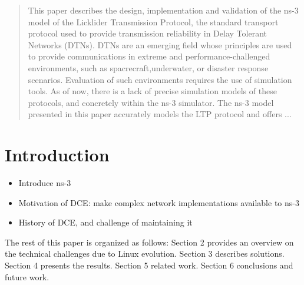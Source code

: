 \documentclass{sig-alternate}
\begin{document}

\maketitle
\begin{abstract}
This paper describes the design, implementation and validation
of the ns-3 model of the Licklider Transmission Protocol, the standard
transport protocol used to provide transmission reliability in Delay Tolerant Networks (DTNs).
DTNs are an emerging field whose principles are used to provide communications 
in extreme and performance-challenged environments, such as spacrecraft,underwater, or
disaster response scenarios. Evaluation of such environments requires the use of simulation tools.
As of now, there is a lack of precise simulation models of these protocols, and concretely within the ns-3 simulator.
The ns-3 model presented in this paper accurately models the LTP protocol and offers ...
\end{abstract}




\section{Introduction}

\begin{itemize}
\item Introduce ns-3
\item Motivation of DCE: make complex network implementations available to ns-3
\item History of DCE, and challenge of maintaining it
\end{itemize}

The rest of this paper is organized as follows: Section 2 provides an overview on the technical challenges due to Linux evolution.
Section 3 describes solutions.
Section 4 presents the results.  Section 5 related work.  Section 6 conclusions
and future work.
\end{document}
